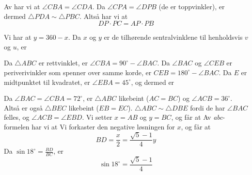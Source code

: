 




	\footnotesize
\opgt

Av  har vi at $ \angle CBA=\angle CDA $. Da $ \angle CPA=\angle DPB $ (de er toppvinkler), er dermed $ \triangle PDA \sim \triangle PBC$. Altså har vi at
\[ DP\cdot PC=AP\cdot PB \]

Vi har at $ y=360-x $. Da $ x $ og $ y $ er de tilhørende sentralvinklene til henholdsvis $ v $ og $ u $, er

\newpage
{}
Da $ \triangle ABC $ er rettvinklet, er $ \angle CBA=90^\circ-\angle BAC $. Da $ \angle BAC $ og $ \angle CEB $ er periverivinkler som spenner over samme korde, er $ CEB=180^\circ-\angle BAC $. Da $ E $ er midtpunktet til kvadratet, er $ \angle EBA=45^\circ$, og dermed er

Da $ \angle BAC=\angle CBA=72^\circ $, er $ \triangle ABC $ likebeint ($ AC=BC $) og $ \angle ACB= 36^\circ $. Altså er også $ \triangle BEC $ likebeint ($ EB=EC $). $ \triangle ABC \sim \triangle DBE$ fordi de har $ \angle BAC $ felles, og $ \angle ACB=\angle EBD $. Vi setter $ x=AB $ og $ y=BC $, og får at
Av \textit{abc}-formelen har vi at
Vi forkaster den negative løsningen for $ x $, og får at
\[BD=\frac{x}{2}=\frac{\sqrt{5}-1}{4}y  \]
Da $ \sin 18^\circ=\frac{BD}{BC} $, er
\[ \sin 18^\circ = \frac{\sqrt{5}-1}{4} \]


